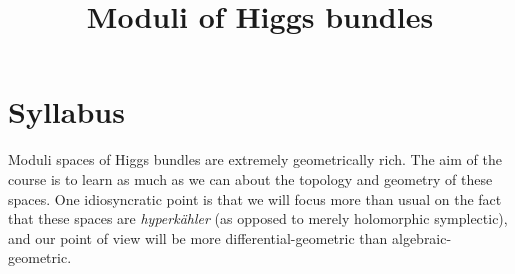 \documentclass[12pt,letterpaper,reqno]{amsart}
\numberwithin{equation}{section}
\newcommand{\hk}{hyperk\"ahler\xspace}
\newcommand{\ti}[1]{\textit{#1}}
\begin{document}
\title{Moduli of Higgs bundles}
\date{}

\maketitle

\setcounter{page}{1}

\section{Syllabus}

Moduli spaces of Higgs bundles are extremely 
geometrically rich.
The aim of the course is to learn as much as we can about 
the topology and geometry of these spaces. One 
idiosyncratic point is that we will focus more than 
usual on the fact that these spaces are \ti{\hk} 
(as opposed to merely holomorphic symplectic),
and our point of view will be more differential-geometric
than algebraic-geometric.
\end{document}
